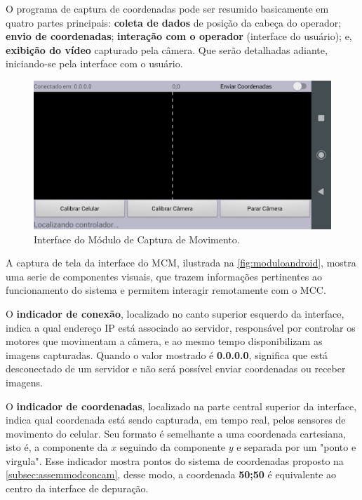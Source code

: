 O programa de captura de coordenadas pode ser resumido basicamente em quatro partes principais: \textbf{coleta de dados} de posição da cabeça do operador; \textbf{envio de coordenadas}; \textbf{interação com o operador} (interface do usuário); e, \textbf{exibição do vídeo} capturado pela câmera. Que serão detalhadas adiante, iniciando-se pela  interface com o usuário.\par


\begin{figure}[H]
	\centering
	\includegraphics[width=1\textwidth]{figuras/modulo_android_1.png}
	\caption{Interface do Módulo de Captura de Movimento.}
	\label{fig:moduloandroid}
\end{figure}

A captura de tela da interface do MCM, ilustrada na \autoref{fig:moduloandroid}, mostra uma serie de componentes visuais, que trazem informações pertinentes ao funcionamento do sistema e permitem interagir remotamente com o MCC. \par

O \textbf{indicador de conexão}, localizado no canto superior esquerdo da interface, indica a qual endereço IP está associado ao servidor, responsável por controlar os motores que movimentam a câmera, e ao mesmo tempo disponibilizam as imagens capturadas. Quando o valor mostrado é \textbf{0.0.0.0}, significa que está desconectado de um servidor e não será possível enviar coordenadas ou receber imagens.\par

O \textbf{indicador de coordenadas}, localizado na parte central superior da interface, indica qual coordenada está sendo capturada, em tempo real, pelos sensores de movimento do celular. Seu formato é semelhante a uma coordenada cartesiana, isto é, a componente da $x$ seguindo da componente $y$ e separada por um "ponto e virgula". Esse indicador mostra pontos do sistema de coordenadas proposto na \autoref{subsec:assemmodconcam}, desse modo, a coordenada \textbf{50;50} é equivalente ao centro da interface de depuração.\par


